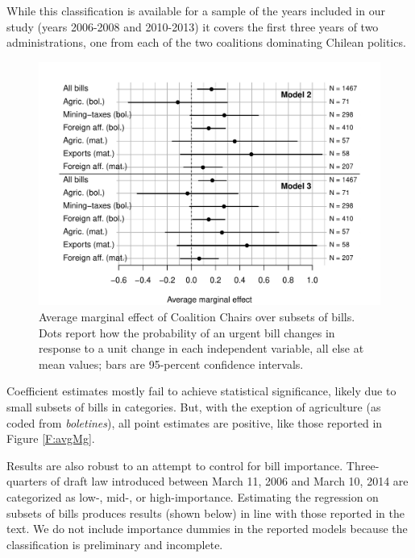 \documentclass[letter,12pt]{article}
\begin{document}
While this classification is available for a sample of the years included in our study (years 2006-2008 and 2010-2013) it covers the first three years of two administrations, one from each of the two coalitions dominating Chilean politics.



\begin{figure}
  \centering
    \caption{Average marginal effect of Coalition Chairs over subsets of bills. Dots report how the probability of an urgent bill changes in response to a unit change in each independent variable, all else at mean values; bars are 95-percent confidence intervals.}\label{F:avgMgSub}
    \includegraphics[width=.9\columnwidth]{../graphs/avgMgEffects-subsets.pdf}
\end{figure}

Coefficient estimates mostly fail to achieve statistical significance, likely due to small subsets of bills in categories. But, with the exeption of agriculture (as coded from \emph{boletines}), all point estimates are positive, like those reported in Figure \ref{F:avgMg}. 

Results are also robust to an attempt to control for bill importance. Three-quarters of draft law introduced between March 11, 2006 and March 10, 2014 are categorized as low-, mid-, or high-importance. Estimating the regression on subsets of bills produces results (shown below) in line with those reported in the text. We do not include importance dummies in the reported models because the classification is preliminary and incomplete. 
\end{document}
